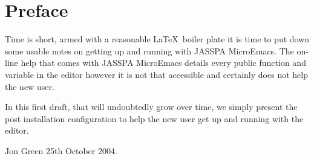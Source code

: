 \documentclass[11pt,a4paper,pdftex]{article}
\begin{document}
\newpage
\setlength{\parindent}{0pt}
\setlength{\parskip}{0.5ex}
\pagestyle{fancy}

\section*{Preface}

Time is short, armed with a reasonable \LaTeX\ boiler plate it is time to put
down some usable notes on getting up and running with JASSPA MicroEmacs. The
on-line help that comes with JASSPA MicroEmacs details every public function
and variable in the editor however it is not that accessible and certainly
does not help the new user.

In this first draft, that will undoubtedly grow over time, we simply present
the post installation configuration to help the new user get up and running
with the editor.

Jon Green\newline
25th October 2004.


\newpage
{}          %
\tableofcontents
\newpage


\cleardoublepage
\setcounter{pagetemp}{\value{page}}     %
\setcounter{page}{\value{pagetemp}}     %
\end{document}
